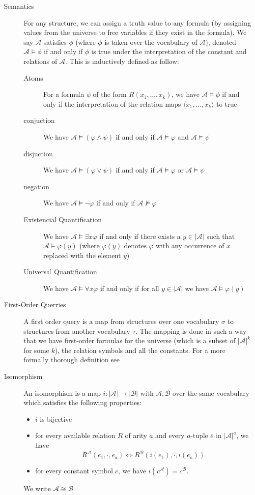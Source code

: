 \begin{description}
    \item[Semantics] For any structure, we can assign a truth value to any formula (by assigning values from the universe to free variables if they exist in the formula). We say $\mathcal{A}$ satisfies $\phi$ (where $\phi$ is taken over the vocabulary of $\mathcal{A}$), denoted $\mathcal{A} \models \phi$ if and only if $\phi$ is true under the interpretation of the constant and relations of $\mathcal{A}$. This is inductively defined as follow:
    \begin{description}
        \item[Atoms] For a formula $\phi$ of the form $R(x_1, \dots, x_k)$, we have $\mathcal{A} \models \phi$ if and only if the interpretation of the relation maps $\langle x_1, \dots, x_k \rangle$ to true
        \item[conjuction] We have $\mathcal{A} \models (\varphi \land \psi)$ if and only if $\mathcal{A} \models \varphi$ and $\mathcal{A} \models \psi$
        \item[disjuction]  We have $\mathcal{A} \models (\varphi \lor \psi)$ if and only if $\mathcal{A} \models \varphi$ or $\mathcal{A} \models \psi$
        \item[negation] We have $\mathcal{A} \models \lnot \varphi$ if and only if $\mathcal{A} \not\models \varphi$
        \item[Existencial Quantification] We have $\mathcal{A} \models \exists x\varphi$ if and only if there exists a $y \in |\mathcal{A}|$ such that $\mathcal{A} \models \varphi(y)$ (where $\varphi(y)$ denotes $\varphi$ with any occurrence of $x$ replaced with the element $y$)
        \item[Universal Quantification] We have $\mathcal{A} \models \forall x\varphi$ if and only if for all $y \in |\mathcal{A}|$ we have $\mathcal{A} \models \varphi(y)$
    \end{description}
    \item[First-Order Querries] A first order query is a map from structures over one vocabulary $\sigma$ to structures from another vocabulary $\tau$.
    The mapping is done in such a way that we have first-order formulas for the universe (which is a subset of $|\mathcal{A}|^k$ for some $k$), the relation symbols and all the constants.
    For a more formally thorough definition see~\cite{descriptive-complexity}
    \item[Isomorphism] An isomorphism is a map $i: |\mathcal{A}| \to |\mathcal{B}|$ with $\mathcal{A}, \mathcal{B}$ over the same vocabulary which satisfies the following properties:
    \begin{itemize}
        \setlength\itemsep{0.2em}
        \item $i$ is bijective
        \item for every available relation $R$ of arity $a$ and every $a$-tuple $\overline{e}$ in $|\mathcal{A}|^a$, we have \[R^{\mathcal{A}}(e_1, \cdot, e_a) \Leftrightarrow R^{\mathcal{B}}(i(e_1), \cdot, i(e_a))\]
        \item for every constant symbol $c$, we have $i(c^{\mathcal{A}}) = c^{\mathcal{B}}$.
    \end{itemize}
    We write $\mathcal{A} \cong \mathcal{B}$
\end{description}


